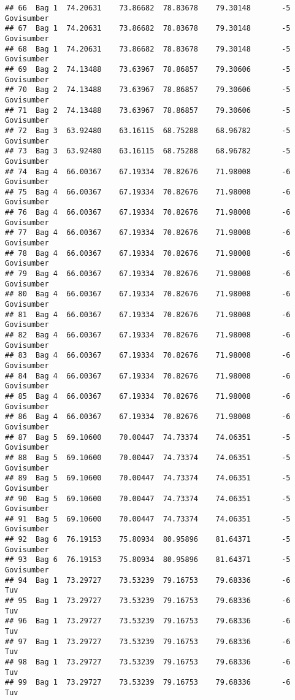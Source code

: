 \documentclass[
]{article}
\begin{document}
\begin{verbatim}
## 66  Bag 1  74.20631    73.86682  78.83678    79.30148       -5 Govisumber
## 67  Bag 1  74.20631    73.86682  78.83678    79.30148       -5 Govisumber
## 68  Bag 1  74.20631    73.86682  78.83678    79.30148       -5 Govisumber
## 69  Bag 2  74.13488    73.63967  78.86857    79.30606       -5 Govisumber
## 70  Bag 2  74.13488    73.63967  78.86857    79.30606       -5 Govisumber
## 71  Bag 2  74.13488    73.63967  78.86857    79.30606       -5 Govisumber
## 72  Bag 3  63.92480    63.16115  68.75288    68.96782       -5 Govisumber
## 73  Bag 3  63.92480    63.16115  68.75288    68.96782       -5 Govisumber
## 74  Bag 4  66.00367    67.19334  70.82676    71.98008       -6 Govisumber
## 75  Bag 4  66.00367    67.19334  70.82676    71.98008       -6 Govisumber
## 76  Bag 4  66.00367    67.19334  70.82676    71.98008       -6 Govisumber
## 77  Bag 4  66.00367    67.19334  70.82676    71.98008       -6 Govisumber
## 78  Bag 4  66.00367    67.19334  70.82676    71.98008       -6 Govisumber
## 79  Bag 4  66.00367    67.19334  70.82676    71.98008       -6 Govisumber
## 80  Bag 4  66.00367    67.19334  70.82676    71.98008       -6 Govisumber
## 81  Bag 4  66.00367    67.19334  70.82676    71.98008       -6 Govisumber
## 82  Bag 4  66.00367    67.19334  70.82676    71.98008       -6 Govisumber
## 83  Bag 4  66.00367    67.19334  70.82676    71.98008       -6 Govisumber
## 84  Bag 4  66.00367    67.19334  70.82676    71.98008       -6 Govisumber
## 85  Bag 4  66.00367    67.19334  70.82676    71.98008       -6 Govisumber
## 86  Bag 4  66.00367    67.19334  70.82676    71.98008       -6 Govisumber
## 87  Bag 5  69.10600    70.00447  74.73374    74.06351       -5 Govisumber
## 88  Bag 5  69.10600    70.00447  74.73374    74.06351       -5 Govisumber
## 89  Bag 5  69.10600    70.00447  74.73374    74.06351       -5 Govisumber
## 90  Bag 5  69.10600    70.00447  74.73374    74.06351       -5 Govisumber
## 91  Bag 5  69.10600    70.00447  74.73374    74.06351       -5 Govisumber
## 92  Bag 6  76.19153    75.80934  80.95896    81.64371       -5 Govisumber
## 93  Bag 6  76.19153    75.80934  80.95896    81.64371       -5 Govisumber
## 94  Bag 1  73.29727    73.53239  79.16753    79.68336       -6        Tuv
## 95  Bag 1  73.29727    73.53239  79.16753    79.68336       -6        Tuv
## 96  Bag 1  73.29727    73.53239  79.16753    79.68336       -6        Tuv
## 97  Bag 1  73.29727    73.53239  79.16753    79.68336       -6        Tuv
## 98  Bag 1  73.29727    73.53239  79.16753    79.68336       -6        Tuv
## 99  Bag 1  73.29727    73.53239  79.16753    79.68336       -6        Tuv

\end{verbatim}
\end{document}
